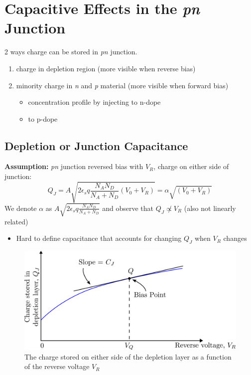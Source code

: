 \documentclass{report}
\begin{document}
\section{Capacitive Effects in the \textit{pn} Junction}

2 ways charge can be stored in \textit{pn} junction.
\begin{enumerate}
	\item charge in depletion region (more visible when reverse bias)
	\item minority charge in \textit{n} and \textit{p} material (more visible when forward bias)
	\begin{itemize}
		\item concentration profile by injecting to n-dope
		\item {}\phantom{concentration profile by injecting} to p-dope
	\end{itemize}
\end{enumerate}

\subsection{Depletion or Junction Capacitance}\label{sec:3.6.1-depletion-or...}

\textbf{Assumption:} \textit{pn} junction reversed bias with $V_R$, charge on either side of junction:
\begin{equation}
	Q_J = A \sqrt{2\epsilon_s q \frac{N_A N_D}{N_A + N_D} \left(V_0 + V_R\right)} = \alpha \sqrt{\left(V_0 + V_R\right)}
	\label{eq:3.6-alpha-v0-vr}
\end{equation}
We denote $\alpha$ as $A \sqrt{2\epsilon_s q \frac{N_A N_D}{N_A + N_D}}$ and observe that $Q_J \not\propto V_R$ (also not linearly related)
\begin{itemize}
	\item Hard to define capacitance that accounts for changing $Q_J$ when $V_R$ changes
\end{itemize}

\begin{figure}[!hbpt]
	\centering
	\includegraphics{figures/path172092.png}
	\caption{The charge stored on either side of the depletion layer as a function of the reverse voltage $V_R$}
	\label{fig:charge-volt-cap-graph}
\end{figure}
\end{document}
